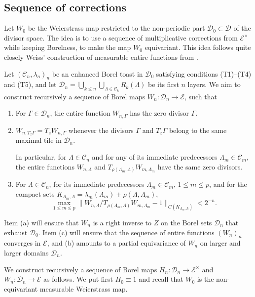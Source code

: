 \documentclass[11pt]{paper}
\newcommand{\cE}{\mathcal E}
\newcommand{\cD}{\mathcal D}
\newcommand{\cC}{\mathcal C}
\newcommand{\la}{\lambda}
\begin{document}
\subsection{Sequence of corrections}\label{subsect:corections}
Let $W_0$ be the Weierstrass map restricted to the non-periodic part $\cD_0\subset \cD$
of the divisor space.
The idea is to use a sequence of multiplicative corrections from $\cE^{\times}$ while
keeping Borelness, to make the map $W_0$ equivariant. This idea follows
quite closely Weiss' construction of measurable entire functions from \cite{Weiss}.

Let $(\cC_n, \la_n)_n$ be an enhanced Borel toast in $\cD_0$ satisfying conditions (T1)--(T4) and (T5),
and let $\mathcal{D}_n=\bigcup_{k\le n}\bigcup_{\Lambda\in\cC_k}R_k(\Lambda)$ be its
first $n$ layers. We aim to construct recursively a sequence of Borel maps
$W_n\colon \mathcal{D}_n\to \cE$, such that
\begin{enumerate}
\item[(a)] For $\Gamma\in\cD_n$, the entire function $W_{n, \Gamma}$ has the zero divisor
$\Gamma$.
\item[(b)] $W_{n,T_z \Gamma}=T_z W_{n,\Gamma}$ whenever the divisors $\Gamma$ and $T_z \Gamma$ belong to the same maximal tile in $\mathcal{D}_n$.

In particular, for $\Lambda\in\cC_n$ and for any of its immediate predecessors $\Lambda_m\in \cC_m$,
the entire functions $W_{n,\Lambda}$ and $T_{\rho(\Lambda_m ,\Lambda)} W_{m, \Lambda_m}$
have the same zero divisors.
\item[(c)] For $\Lambda\in\cC_n$, for its immediate predecessors
$\Lambda_m\in\cC_m$, $1\le m\le p$, and for the compact sets
$K_{\Lambda_m, \Lambda}  =\lambda_m(\Lambda_m)+\rho(\Lambda, \Lambda_m)$,
\[
\max_{1\le m \le p}\big\lVert W_{n,\Lambda}/T_{\rho(\Lambda_m, \Lambda)}W_{m, \Lambda_m}
-  1\big\rVert_{C(K_{\Lambda_m, \Lambda})} < 2^{-n}.
\]
\end{enumerate}

\noindent Item {\rm (a)} will ensure that $W_n$ is a right inverse to $Z$ on the
Borel sets $\mathcal{D}_n$ that exhaust $\cD_0$.
Item {\rm (c)} will ensure that the sequence of entire functions $(W_n)_{n}$ converges in $\cE$,
and {\rm (b)} amounts to a partial equivariance of $W_n$ on larger and larger domains $\cD_n$.


\medskip

We construct recursively a sequence of Borel maps
$H_n\colon \cD_n\to\cE^\times$ and
$W_n\colon \cD_n\to\cE$
as follows. We put first $H_0\equiv 1$ and recall that $W_0$ is the non-equivariant
measurable Weierstrass map.
\end{document}
